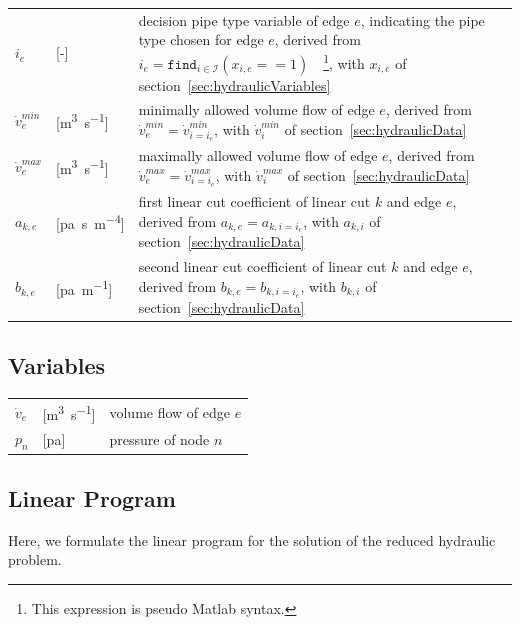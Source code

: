 \documentclass[a4paper,10pt]{article}
\begin{document}
\begin{tabularx}{\textwidth}{llX}
  $i_e$ &[-]& decision pipe type variable of edge $e$,
              indicating the pipe type chosen for edge $e$,
              derived from $i_e=\texttt{find}_{i\in\mathcal{I}}(x_{i,e}==1)$\ \ \footnote{This expression is pseudo Matlab syntax.},
              with $x_{i,e}$ of section~\ref{sec:hydraulicVariables}\\
  $\dot{v}_e^{min}$ &[\si{m^{3}.s^{-1}}]& minimally allowed volume flow of edge $e$,
                                          derived from $\dot{v}_e^{min}=\dot{v}_{i=i_e}^{min}$,
                                          with $\dot{v}_i^{min}$ of section~\ref{sec:hydraulicData}\\
  $\dot{v}_e^{max}$ &[\si{m^{3}.s^{-1}}]& maximally allowed volume flow of edge $e$,
                                          derived from $\dot{v}_e^{max}=\dot{v}_{i=i_e}^{max}$,
                                          with $\dot{v}_i^{max}$ of section~\ref{sec:hydraulicData}\\
  $a_{k,e}$ &[\si{pa.s.m^{-4}}]& first linear cut coefficient of linear cut $k$ and edge $e$,
                                 derived from $a_{k,e}=a_{k,i=i_e}$,
                                 with $a_{k,i}$ of section~\ref{sec:hydraulicData}\\
  $b_{k,e}$ &[\si{pa.m^{-1}}]& second linear cut coefficient of linear cut $k$ and edge $e$,
                               derived from $b_{k,e}=b_{k,i=i_e}$,
                               with $b_{k,i}$ of section~\ref{sec:hydraulicData}
\end{tabularx}

\subsection{Variables}\label{sec:reducedHydraulicVariables}

\begin{tabularx}{\textwidth}{llX}
  $\dot{v}_{e}$ &[\si{m^{3}.s^{-1}}]& volume flow of edge $e$\\
  $p_n$ &[\si{pa}]& pressure of node $n$
\end{tabularx}

\subsection{Linear Program}

Here, we formulate the linear program for the solution of the reduced hydraulic problem.
\end{document}
